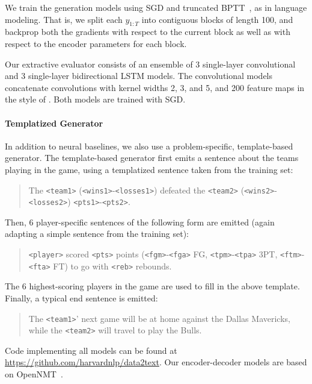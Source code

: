 \documentclass[11pt,letterpaper]{article}
\begin{document}
We train the generation models using SGD and
truncated BPTT~\cite{elman1990,mikolov-2010}, as in language
modeling. That is, we split each $y_{1:T}$ into contiguous blocks of length 100, and backprop both the gradients with respect to the current block as well as with respect to the encoder parameters for each block.

Our extractive evaluator consists of an ensemble of 3 single-layer
convolutional and 3 single-layer bidirectional LSTM models. The convolutional models
concatenate convolutions with kernel widths 2, 3, and 5, and 200
feature maps in the style of \cite{kim2014convolutional}.
Both models are trained with SGD.

\paragraph{Templatized Generator} In addition to neural baselines, we also use a problem-specific,
template-based generator. The template-based generator first emits a sentence about the teams playing in the game, using a templatized
sentence taken from the training set:

\begin{quote}
{\small The \texttt{<team1>} (\texttt{<wins1>}-\texttt{<losses1>}) defeated the \texttt{<team2>} (\texttt{<wins2>}-\texttt{<losses2>}) \texttt{<pts1>}-\texttt{<pts2>}. }
\end{quote}

\noindent Then, 6 player-specific sentences of the following form are emitted (again adapting a simple sentence from the training set):
\begin{quote}
{\small \texttt{<player>} scored \texttt{<pts>} points (\texttt{<fgm>}-\texttt{<fga>} FG, \texttt{<tpm>}-\texttt{<tpa>} 3PT, \texttt{<ftm>}-\texttt{<fta>} FT) to go with \texttt{<reb>} rebounds. }
\end{quote}

\noindent The 6 highest-scoring players in the game are used to fill in the above template. Finally, a typical end sentence is emitted:

\begin{quote}
{\small The \texttt{<team1>}' next game will be at home against the Dallas Mavericks, while the \texttt{<team2>} will travel to play the Bulls.}
\end{quote}


Code implementing all models can be found at \url{https://github.com/harvardnlp/data2text}. Our encoder-decoder models are based on OpenNMT~\cite{opennmt}.
\end{document}
